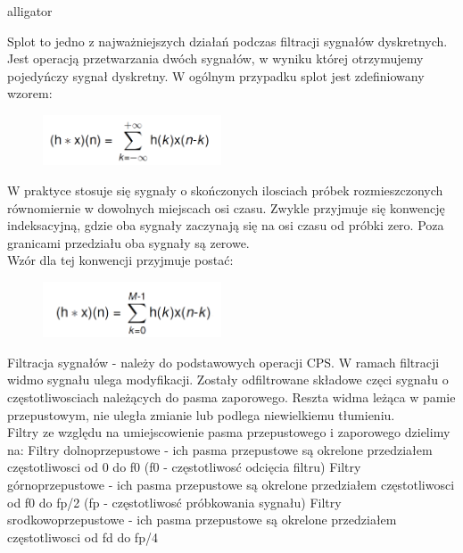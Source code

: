 \documentclass[12pt]{article}
\begin{document}
\begin{labeling}{alligator}


\item [Splot] to jedno z najważniejszych działań podczas filtracji sygnałów dyskretnych. Jest operacją przetwarzania dwóch sygnałów, w wyniku której otrzymujemy pojedyńczy sygnał dyskretny.  W ogólnym przypadku splot jest zdefiniowany wzorem:
\\
\begin{figure}[h!]
 \centering
 \includegraphics[width=5.3cm]{splotWO.PNG}
 \vspace{-0.3cm}
 \label{Widok_aplikacjis}
\end{figure}
W praktyce stosuje się sygnały o skończonych ilosciach próbek rozmieszczonych równomiernie w dowolnych miejscach osi czasu. Zwykle przyjmuje się konwencję indeksacyjną, gdzie oba sygnały zaczynają się  na osi czasu od próbki zero. Poza granicami przedziału oba sygnały są zerowe. 
\\Wzór dla tej konwencji przyjmuje postać: 
\begin{figure}[h!]
 \centering
 \includegraphics[width=5.3cm]{splotWS.PNG}
 \vspace{-0.3cm}
 \label{Splot_indeks}
\end{figure}


\item [Filtracja sygnałów]  - należy do podstawowych operacji CPS. W ramach filtracji widmo sygnału ulega modyfikacji. Zostały odfiltrowane składowe częci sygnału o częstotliwosciach należących do pasma zaporowego. Reszta widma leżąca w pamie przepustowym, nie uległa zmianie lub podlega niewielkiemu tłumieniu. 
\\Filtry ze względu na umiejscowienie pasma przepustowego i zaporowego dzielimy na:
\subitem Filtry dolnoprzepustowe - ich pasma przepustowe są okrelone przedziałem częstotliwosci od 0 do f0 (f0 - częstotliwosć odcięcia filtru) 
\subitem Filtry górnoprzepustowe - ich pasma przepustowe są okrelone przedziałem częstotliwosci od f0 do fp/2 (fp - częstotliwosć próbkowania sygnału) 
\subitem Filtry srodkowoprzepustowe - ich pasma przepustowe są okrelone przedziałem częstotliwosci od fd do fp/4 


\end{labeling}
\end{document}
